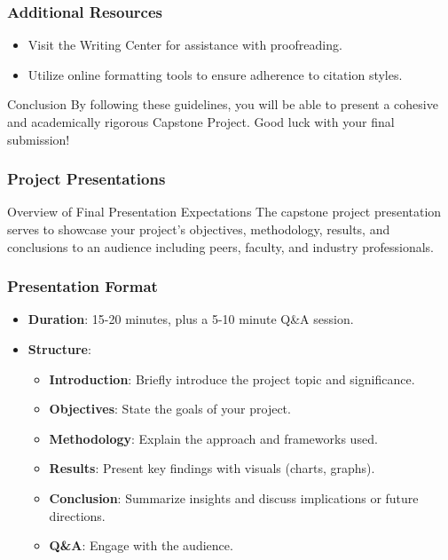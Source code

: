 \documentclass[aspectratio=169]{beamer}
\begin{document}
\begin{frame}[fragile]
    \frametitle{Additional Resources}
    \begin{itemize}
        \item Visit the Writing Center for assistance with proofreading.
        \item Utilize online formatting tools to ensure adherence to citation styles.
    \end{itemize}
    
    \begin{block}{Conclusion}
        By following these guidelines, you will be able to present a cohesive and academically rigorous Capstone Project. Good luck with your final submission!
    \end{block}
\end{frame}

\begin{frame}[fragile]
    \frametitle{Project Presentations}
    \begin{block}{Overview of Final Presentation Expectations}
        The capstone project presentation serves to showcase your project's objectives, methodology, results, and conclusions to an audience including peers, faculty, and industry professionals.
    \end{block}
\end{frame}

\begin{frame}[fragile]
    \frametitle{Presentation Format}
    \begin{itemize}
        \item \textbf{Duration}: 15-20 minutes, plus a 5-10 minute Q\&A session.
        \item \textbf{Structure}:
        \begin{itemize}
            \item \textbf{Introduction}: Briefly introduce the project topic and significance.
            \item \textbf{Objectives}: State the goals of your project.
            \item \textbf{Methodology}: Explain the approach and frameworks used.
            \item \textbf{Results}: Present key findings with visuals (charts, graphs).
            \item \textbf{Conclusion}: Summarize insights and discuss implications or future directions.
            \item \textbf{Q\&A}: Engage with the audience.
        \end{itemize}
    \end{itemize}
\end{frame}
\end{document}
